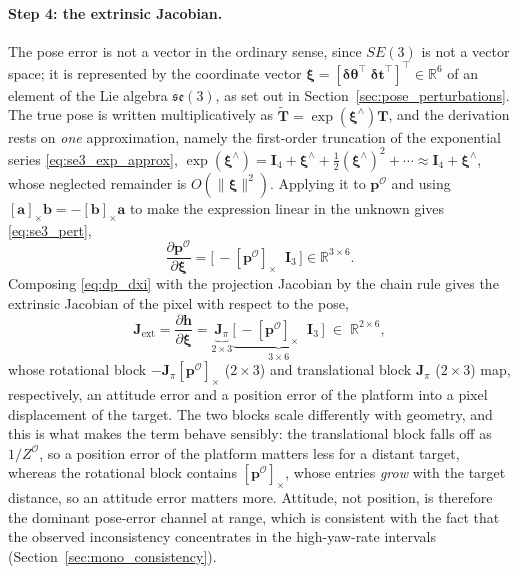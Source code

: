 \paragraph*{Step 4: the extrinsic Jacobian.} The pose error is not a vector in the
ordinary sense, since $SE(3)$ is not a vector space; it is represented by the
coordinate vector
$\bm{\xi}=[\bm{\delta\theta}^{\top}\;\bm{\delta t}^{\top}]^{\top}\in\mathbb{R}^{6}$
of an element of the Lie algebra $\mathfrak{se}(3)$, as set out in
Section~\ref{sec:pose_perturbations}. The true pose is written multiplicatively as
$\tilde{\bm{T}}=\exp(\bm{\xi}^{\wedge})\bm{T}$, and the derivation rests on
\emph{one} approximation, namely the first-order truncation of the exponential
series \eqref{eq:se3_exp_approx},
$\exp(\bm{\xi}^{\wedge})=\bm{I}_4+\bm{\xi}^{\wedge}+\tfrac{1}{2}(\bm{\xi}^{\wedge})^{2}+\cdots\approx\bm{I}_4+\bm{\xi}^{\wedge}$,
whose neglected remainder is $O(\lVert\bm{\xi}\rVert^{2})$. Applying it to
$\bm{p}^{\mathcal{O}}$ and using $[\bm{a}]_\times\bm{b}=-[\bm{b}]_\times\bm{a}$ to
make the expression linear in the unknown gives \eqref{eq:se3_pert},
\begin{equation}
  \frac{\partial\bm{p}^{\mathcal{O}}}{\partial\bm{\xi}}
  = \big[\,-[\bm{p}^{\mathcal{O}}]_\times \;\; \bm{I}_3\,\big] \in \mathbb{R}^{3\times6}.
  \label{eq:dp_dxi}
\end{equation}
Composing \eqref{eq:dp_dxi} with the projection Jacobian by the chain rule gives
the extrinsic Jacobian of the pixel with respect to the pose,
\begin{equation}
  \bm{J}_{\mathrm{ext}}
  = \frac{\partial\bm{h}}{\partial\bm{\xi}}
  = \underbrace{\bm{J}_{\pi}}_{2\times3}
    \underbrace{\big[\,-[\bm{p}^{\mathcal{O}}]_\times \;\; \bm{I}_3\,\big]}_{3\times6}
  \;\in\;\mathbb{R}^{2\times6},
  \label{eq:Jext}
\end{equation}
whose rotational block $-\bm{J}_{\pi}[\bm{p}^{\mathcal{O}}]_\times$
($2\times3$) and translational block $\bm{J}_{\pi}$ ($2\times3$) map,
respectively, an attitude error and a position error of the platform into a pixel
displacement of the target. The two blocks scale differently with geometry, and
this is what makes the term behave sensibly: the translational block falls off as
$1/Z^{\mathcal{O}}$, so a position error of the platform matters less for a
distant target, whereas the rotational block contains
$[\bm{p}^{\mathcal{O}}]_\times$, whose entries \emph{grow} with the target
distance, so an attitude error matters more. Attitude, not position, is therefore
the dominant pose-error channel at range, which is consistent with the fact that
the observed inconsistency concentrates in the high-yaw-rate intervals
(Section~\ref{sec:mono_consistency}).

